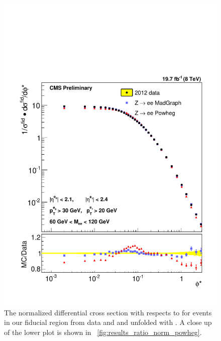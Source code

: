 \begin{figure}[!p]
    \centering
    \includegraphics[width=\textwidth]{figures/ZShape_elec_PH_Norm_Dressed.pdf}
    \caption[
        The normalized differential cross section with respects to \phistar for
        \Ztoee events in our fiducial region from data and \MADGRAPH and
        \POWHEG unfolded with \POWHEG.
    ]{
        The normalized differential cross section with respects to \phistar for
        \Ztoee events in our fiducial region from data and \MADGRAPH and
        \POWHEG unfolded with \POWHEG. A close up of the lower plot is shown in
        \FIG~\ref{fig:results_ratio_norm_powheg}.
    }
    \label{fig:results_norm_powheg}
\end{figure}


